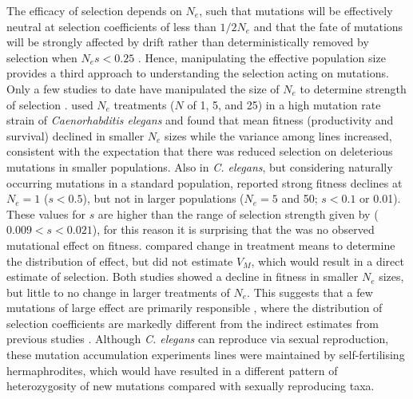 The efficacy of selection depends on $N_e$, such that mutations will be effectively neutral at selection coefficients of less than $1/2N_e$ \citep{Wrig31} and that the fate of mutations will be strongly affected by drift rather than deterministically removed by selection when $N_es<0.25$ \citep{Falc81}. Hence, manipulating the effective population size provides a third approach to understanding the selection acting on mutations. Only a few studies to date have manipulated the size of $N_e$ to determine strength of selection \citep{Este04, Sila07, Katj15}. \citet{Este04} used $N_e$ treatments ($N$ of 1, 5, and 25) in a high mutation rate strain of \textit{Caenorhabditis elegans} and found that mean fitness (productivity and survival) declined in smaller $N_e$ sizes while the variance among lines increased, consistent with the expectation that there was reduced selection on deleterious mutations in smaller populations. Also in \textit{C. elegans}, but considering naturally occurring mutations in a standard population, \citet{Katj15} reported strong fitness declines at $N_e = 1$ ($s <0.5$), but not in larger populations ($N_e = 5$ and 50; $s <0.1$ or 0.01). These values for $s$ are higher than the range of selection strength given by \citet{Houl96} ($0.009<s< 0.021$), for this reason it is surprising that the was no observed mutational effect on fitness. \citet{Katj15} compared change in treatment means to determine the distribution of effect, but did not estimate $V_M$, which would result in a direct estimate of selection. Both studies showed a decline in fitness in smaller $N_e$ sizes, but little to no change in larger treatments of $N_e$. This suggests that a few mutations of large effect are primarily responsible \citep{Este04, Hall09, Katj15}, where the distribution of selection coefficients are markedly different from the indirect estimates from previous studies \citep{Houl96}. Although \textit{C. elegans} can reproduce via sexual reproduction, these mutation accumulation experiments lines were maintained by self-fertilising hermaphrodites, which would have resulted in a different pattern of heterozygosity of new mutations compared with sexually reproducing taxa. \par

